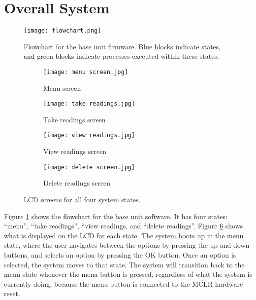 \section{Overall System}
\begin{figure}[htb]
	\centering
	\texttt{[image: flowchart.png]}
	\caption{Flowchart for the base unit firmware. Blue blocks indicate states, and green blocks indicate processes executed within these states.}
	\label{fig: flowchart}
\end{figure}

\begin{figure}[h!]
	\centering
	\begin{subfigure}[b]{0.4\linewidth}
		\texttt{[image: menu screen.jpg]}
		\caption{Menu screen}
		\label{fig: menu screen}
	\end{subfigure}
	\begin{subfigure}[b]{0.4\linewidth}
		\texttt{[image: take readings.jpg]}
		\caption{Take readings screen}
		\label{fig: take readings screen}
	\end{subfigure}
	\begin{subfigure}[b]{0.4\linewidth}
		\texttt{[image: view readings.jpg]}
		\caption{View readings screen}
		\label{fig: view readings screen}
	\end{subfigure}
	\begin{subfigure}[b]{0.4\linewidth}
		\texttt{[image: delete screen.jpg]}
		\caption{Delete readings screen}
		\label{fig: delete readings screen}
	\end{subfigure}
	\caption{LCD screens for all four system states.}
	\label{fig: lcd screens}
\end{figure}

Figure \ref{fig: flowchart} shows the flowchart for the base unit software. It has four states: ``menu'', ``take readings'', ``view readings, and ``delete readings''. Figure \ref{fig: lcd screens} shows what is displayed on the LCD for each state. The system boots up in the menu state, where the user navigates between the options by pressing the up and down buttons, and selects an option by pressing the OK button. Once an option is selected, the system moves to that state. The system will transition back to the menu state whenever the menu button is pressed, regardless of what the system is currently doing, because the menu button is connected to the $\overline{\text{MCLR}}$ hardware reset.\\


